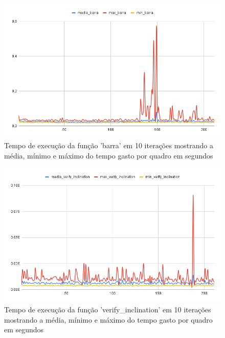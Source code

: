 \begin{figure}[H]
	\centering
	\caption{Tempo de execução da função 'barra' em 10 iterações mostrando a média, mínimo e máximo do tempo gasto por quadro em segundos}
	\includegraphics[scale=0.5]{figuras/grafico/barra.png}
\end{figure}

\begin{figure}[H]
	\centering
	\caption{Tempo de execução da função 'verify\_inclination' em 10 iterações mostrando a média, mínimo e máximo do tempo gasto por quadro em segundos}
	\includegraphics[scale=0.5]{figuras/grafico/inclination.png}
\end{figure}


